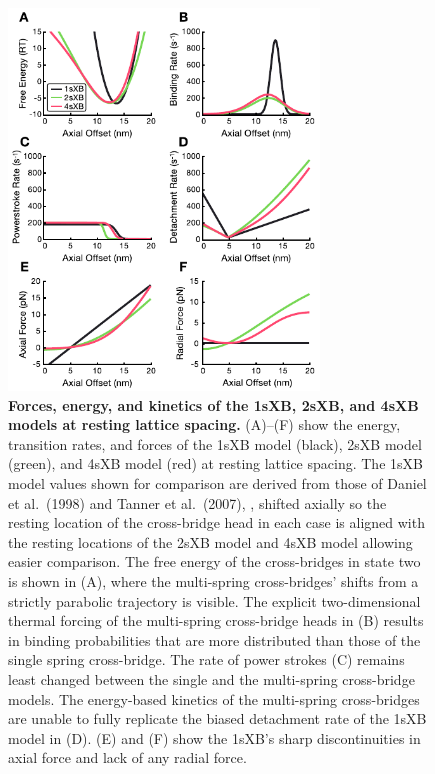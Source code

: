 \documentclass[10pt]{article}
\newcommand{\citep}[1]{\cite{#1}} %
\begin{document}
\clearpage
\begin{figure}[ht]
    \begin{center}
    \includegraphics[width=3.25in]{../imgs/Figure3.pdf}
    \caption{ \textbf{Forces, energy, and kinetics of the 1sXB, 2sXB, and 4sXB models at resting lattice spacing.}
        (A)--(F) show the energy, transition rates, and forces of the 1sXB model (black), 2sXB model (green), and 4sXB model (red) at resting lattice spacing.  
        The 1sXB model values shown for comparison are derived from those of Daniel et al.~(1998) and Tanner et al.~(2007), \protect\citep{Daniel1998, Tanner2007}, shifted axially so the resting location of the cross-bridge head in each case is aligned with the resting locations of the 2sXB model and 4sXB model allowing easier comparison. 
        The free energy of the cross-bridges in state two is shown in (A), where the multi-spring cross-bridges' shifts from a strictly parabolic trajectory is visible. 
        The explicit two-dimensional thermal forcing of the multi-spring cross-bridge heads in (B) results in binding probabilities that are more distributed than those of the single spring cross-bridge.
        The rate of power strokes (C) remains least changed between the single and the multi-spring cross-bridge models.  
        The energy-based kinetics of the multi-spring cross-bridges are unable to fully replicate the biased detachment rate of the 1sXB model in (D).
        (E) and (F) show the 1sXB's sharp discontinuities in axial force and lack of any radial force.
        \label{fig_kinetics_cuts}
        }
    \end{center}
\end{figure}
\end{document}
